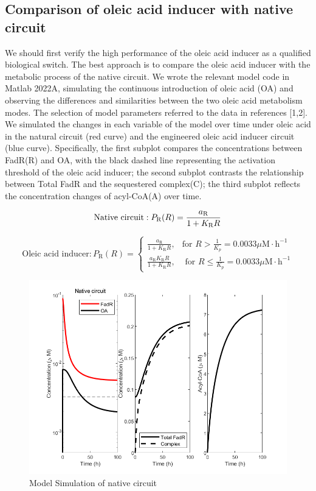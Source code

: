 \documentclass[UTF8]{article}
\begin{document}
\subsection{Comparison of oleic acid inducer with native circuit}
We should first verify the high performance of the oleic acid inducer as a qualified biological switch. The best approach is to compare the oleic acid inducer with the metabolic process of the native circuit. We wrote the relevant model code in Matlab 2022A, simulating the continuous introduction of oleic acid (OA) and observing the differences and similarities between the two oleic acid metabolism modes. The selection of model parameters referred to the data in references [1,2]. We simulated the changes in each variable of the model over time under oleic acid in the natural circuit (red curve) and the engineered oleic acid inducer circuit (blue curve). Specifically, the first subplot compares the concentrations between FadR(R) and OA, with the black dashed line representing the activation threshold of the oleic acid inducer; the second subplot contrasts the relationship between Total FadR and the sequestered complex(C); the third subplot reflects the concentration changes of acyl-CoA(A) over time.

\begin{equation}
	\text{Native circuit}: P_{\mathrm{R}}(R)= 
		\frac{a_{\mathrm{R}}}{1+K_{\mathrm{R}} R}\\
\end{equation}

\begin{equation}
	\text{Oleic acid inducer}: P_{\mathrm{R}}(R)=\left\{\begin{array}{cl}
		\frac{a_{\mathrm{R}}}{1+K_{\mathrm{R}} R}, & \text {for } R> \frac{1}{K_p} = 0.0033 \mu \mathrm{M} \cdot \mathrm{h}^{-1} \\
		\frac{a_{\mathrm{R}} K_{\mathrm{R}} R}{1+K_{\mathrm{R}} R}, & \text { for } R \leq \frac{1}{K_p} =  0.0033 \mu \mathrm{M} \cdot \mathrm{h}^{-1}
	\end{array}\right.
\end{equation}

\begin{figure}[h]
	\centering
	\includegraphics[width=0.75\linewidth]{figures/NAR_fig.png}
	\caption{Model Simulation of native circuit}
	\label{fig:NAR_fig}
\end{figure}
\end{document}
